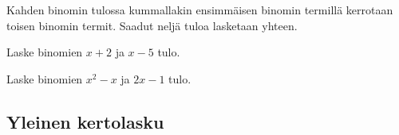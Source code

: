 Kahden binomin tulossa kummallakin ensimmäisen binomin termillä kerrotaan toisen binomin termit. Saadut neljä tuloa lasketaan yhteen. 

\newcommand{\pbezier}[4]{
	\pgfmathsetmacro{\PBxa}{#1}
	\pgfmathsetmacro{\PBxb}{#2}
	\pgfmathsetmacro{\PBya}{#3}
	\pgfmathsetmacro{\PByb}{#3+#4}
	\pgfmathsetmacro{\PBca}{0.8 * \PBxa + 0.2 * \PBxb}
	\pgfmathsetmacro{\PBcb}{0.2 * \PBxa + 0.8 * \PBxb}
	\draw[color=red] (\PBxa, \PBya) .. controls (\PBca, \PByb) and (\PBcb, \PByb) .. (\PBxb, \PBya);
}

\begin{esimerkki}
Laske binomien $x+2$ ja $x-5$ tulo. \\
\newline
\end{esimerkki}

\begin{esimerkki}
Laske binomien $x^2-x$ ja $2x-1$ tulo. \\
\newline
\end{esimerkki}

\subsection*{Yleinen kertolasku}

